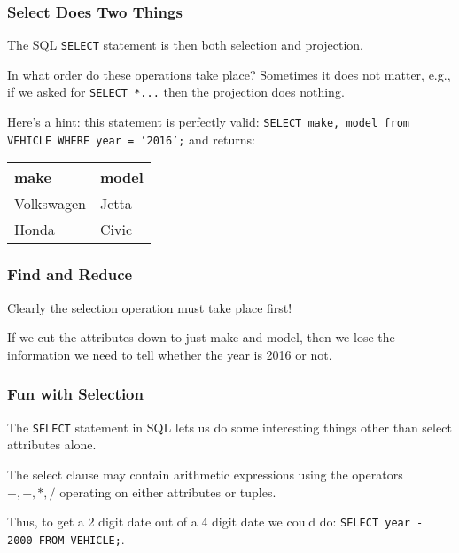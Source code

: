 \begin{frame}
\frametitle{Select Does Two Things}

The SQL \texttt{SELECT} statement is then both selection and projection. 

In what order do these operations take place? Sometimes it does not matter, e.g., if we asked for \texttt{SELECT *...} then the projection does nothing. 

Here's a hint: this statement is perfectly valid: \texttt{SELECT make, model from VEHICLE WHERE year = '2016';} and returns: 

\begin{center}
\begin{tabular}{|l|l|} \hline
\textbf{make} & \textbf{model} \\ \hline
	Volkswagen & Jetta  \\ \hline
	Honda & Civic \\ \hline
\end{tabular}
\end{center}


\end{frame}



\begin{frame}
\frametitle{Find and Reduce}

Clearly the selection operation must take place first! 

If we cut the attributes down to just make and model, then we lose the information we need to tell whether the year is 2016 or not. 

\end{frame}


 

\begin{frame}
\frametitle{Fun with Selection}

The \texttt{SELECT} statement in SQL lets us do some interesting things other than select attributes alone. 

The select clause may contain arithmetic expressions using the operators $+, -, *, /$ operating on either attributes or tuples. 

Thus, to get a 2 digit date out of a 4 digit date we could do: \texttt{SELECT year - 2000 FROM VEHICLE;}.

\end{frame}



